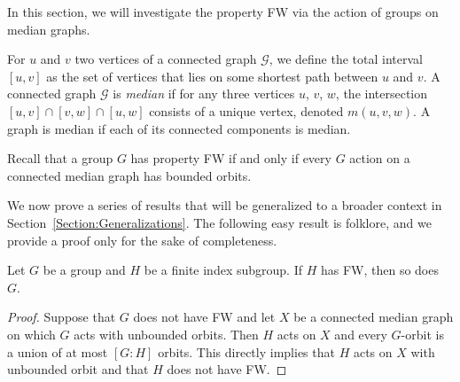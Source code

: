 \label{Section:Median}
In this section, we will investigate the property FW via the action of groups on median graphs.

For $u$ and $v$ two vertices of a connected graph $\mathcal G$, we define the total interval $[u,v]$ as the set of vertices that lies on some shortest path between $u$ and $v$.
A connected graph $\mathcal G$ is \emph{median} if for any three vertices $u$, $v$, $w$, the intersection $[u,v]\cap[v,w]\cap[u,w]$ consists of a unique vertex, denoted $m(u,v,w)$.
A graph is median if each of its connected components is median.

Recall that a group $G$ has property FW if and only if every $G$ action on a connected median graph has bounded orbits.

We now prove a series of results that will be generalized to a broader context in Section~\ref{Section:Generalizations}.
The following easy result is folklore, and we provide a proof only for the sake of completeness.
\begin{lem}\label{Lemma:Subgroup}
Let $G$ be a group and $H$ be a finite index subgroup.
If $H$ has FW, then so does~$G$.
\end{lem}
\begin{proof}
Suppose that $G$ does not have FW and let $X$ be a connected median graph on which $G$ acts with unbounded orbits.
Then $H$ acts on $X$ and every $G$-orbit is a union of at most $[G:H]$ orbits. This directly implies that $H$ acts on $X$ with unbounded orbit and that $H$ does not have FW.
\end{proof}

